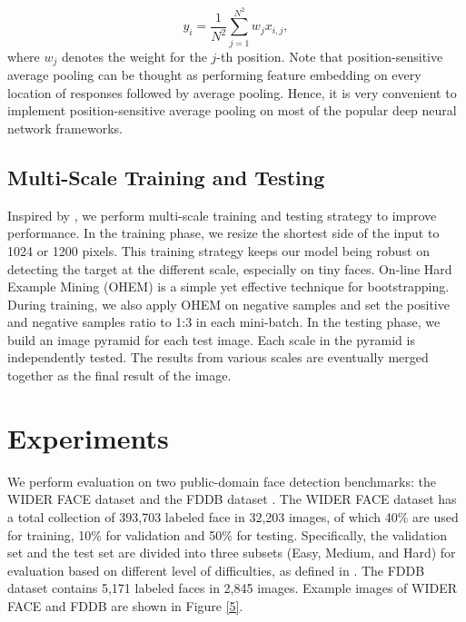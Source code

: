 \documentclass{article} \usepackage{nips13submit_e,times}
\begin{document}
\begin{equation}
\label{equ:intra}
{y_i} = \frac{1}{{{N^2}}}\sum\limits_{j = 1}^{{N^2}} {w_{j} x_{i,j}},
\end{equation}
where $w_{j}$ denotes the weight for the $j$-th position.
Note that position-sensitive average pooling can be thought as performing feature embedding on every location of responses followed by average pooling. Hence, it is very convenient to implement position-sensitive average pooling on most of the popular deep neural network frameworks.




\subsection{Multi-Scale Training and Testing}	

Inspired by \cite{facercnn}, we perform multi-scale training and testing strategy to improve performance. In the training phase, we resize the shortest side of the input to 1024 or 1200 pixels. This training strategy keeps our model being robust on detecting the target at the different scale, especially on tiny faces. 
On-line Hard Example Mining (OHEM) \cite{OHEM} is a simple yet effective technique for bootstrapping. During training, we also apply OHEM on negative samples and set the positive and negative samples ratio to 1:3 in each mini-batch.
In the testing phase, we build an image pyramid for each test image. Each scale in the pyramid is independently tested. The results from various scales are eventually merged together as the final result of the image. 



\section{Experiments}



We perform evaluation on two public-domain face detection benchmarks: the WIDER FACE dataset \cite{wider} and the FDDB dataset \cite{fddb}. 
The WIDER FACE dataset has a total collection of 393,703 labeled face in 32,203 images, of which 40\% are used for training, 10\% for validation and 50\% for testing. Specifically, the validation set and the test set are divided into three subsets (Easy, Medium, and Hard) for evaluation based on different level of difficulties, as defined in \cite{wider}. 
The FDDB dataset contains 5,171 labeled faces in 2,845 images. 
Example images of WIDER FACE and FDDB are shown in Figure \ref{5}.
\end{document}
